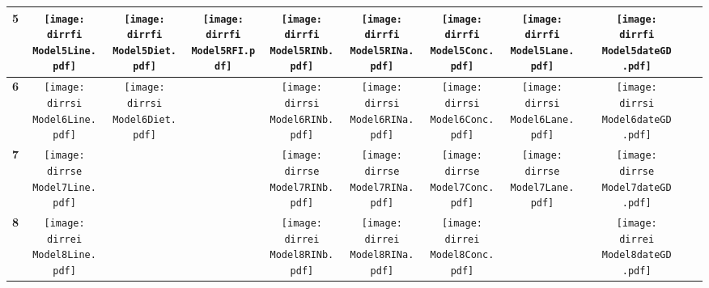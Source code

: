 \documentclass[landscape]{article}
\def \dirrfi {/run/user/1000/gvfs/smb-share:server=cyfiles.iastate.edu,share=09/22/ntyet/R/RA/Data/Reanalysis Data/result/Model5.Line.Diet.RFI.RINb.RINa.Conc.Lane.dateGD/}
\def \dirrsi{/run/user/1000/gvfs/smb-share:server=cyfiles.iastate.edu,share=09/22/ntyet/R/RA/Data/Reanalysis Data/result/Model6.Line.Diet.RINb.RINa.Conc.Lane.dateGD/}
\def \dirrse{/run/user/1000/gvfs/smb-share:server=cyfiles.iastate.edu,share=09/22/ntyet/R/RA/Data/Reanalysis Data/result/Model7.Line.RINb.RINa.Conc.Lane.dateGD/}
\def \dirrei{/run/user/1000/gvfs/smb-share:server=cyfiles.iastate.edu,share=09/22/ntyet/R/RA/Data/Reanalysis Data/result/Model8.Line.RINb.RINa.Conc.dateGD/}
\begin{document}
\begin{table}
\begin{tabular}{cccccccccccc}
     {\Huge \textbf{5}} 
      &\texttt{[image: \\dirrfi Model5Line.pdf]}
      &\texttt{[image: \\dirrfi Model5Diet.pdf]}
      &\texttt{[image: \\dirrfi Model5RFI.pdf]}
      &\texttt{[image: \\dirrfi Model5RINb.pdf]}
      &\texttt{[image: \\dirrfi Model5RINa.pdf]}
      &\texttt{[image: \\dirrfi Model5Conc.pdf]}
      &\texttt{[image: \\dirrfi Model5Lane.pdf]}
      &
      &\texttt{[image: \\dirrfi Model5dateGD.pdf]}
     \\
     \hline
     {\Huge \textbf{6}} 
      &\texttt{[image: \\dirrsi Model6Line.pdf]}
      &\texttt{[image: \\dirrsi Model6Diet.pdf]}
      &
      &\texttt{[image: \\dirrsi Model6RINb.pdf]}
      &\texttt{[image: \\dirrsi Model6RINa.pdf]}
      &\texttt{[image: \\dirrsi Model6Conc.pdf]}
      &\texttt{[image: \\dirrsi Model6Lane.pdf]}
      &
      &\texttt{[image: \\dirrsi Model6dateGD.pdf]}
     \\
     \hline
     {\Huge \textbf{7}} 
      &\texttt{[image: \\dirrse Model7Line.pdf]}
      &
      &
      &\texttt{[image: \\dirrse Model7RINb.pdf]}
      &\texttt{[image: \\dirrse Model7RINa.pdf]}
      &\texttt{[image: \\dirrse Model7Conc.pdf]}
      &\texttt{[image: \\dirrse Model7Lane.pdf]}
      &
      &\texttt{[image: \\dirrse Model7dateGD.pdf]}
     \\
     \hline
     {\Huge \textbf{8}} 
      &\texttt{[image: \\dirrei Model8Line.pdf]}
      &
      &
      &\texttt{[image: \\dirrei Model8RINb.pdf]}
      &\texttt{[image: \\dirrei Model8RINa.pdf]}
      &\texttt{[image: \\dirrei Model8Conc.pdf]}
      &
      &
      &\texttt{[image: \\dirrei Model8dateGD.pdf]}
     \\
     \hline
     
\end{tabular}
\end{table}
\end{document}
